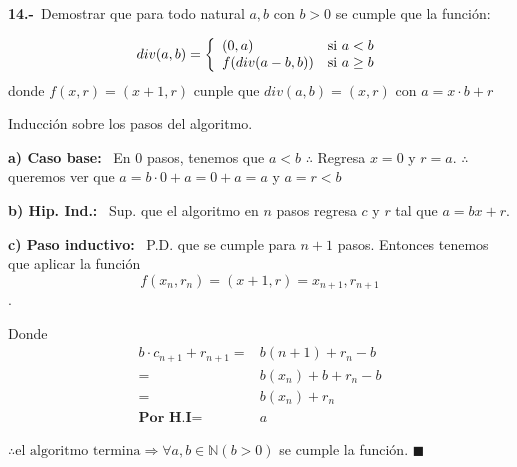 \textbf{14.-}\ Demostrar que para todo natural $a,b$ con $b > 0$ se cumple que la función:

\begingroup
\centering
\begin{equation}
    div(a,b) = \left\lbrace
    \begin{array}{ll}
     (0,a) & \textup{si } a<b\\
     f(div(a-b,b)) & \textup{si } a\geq b
    \end{array}
    \right.
\end{equation}
donde $f(x,r) = (x+1,r)$ cunple que $div(a,b)=(x,r)$ con $a=x\cdot b+r$

\endgroup

\vspace*{1em}
Inducción sobre los pasos del algoritmo.

\textbf{a) Caso base: }\ En $0$ pasos, tenemos que $a<b$ $\therefore$ Regresa $x=0$ y $r=a$. $\therefore$ queremos ver que $a=b\cdot 0 + a = 0+a=a$ y $a = r < b$

\textbf{b) Hip. Ind.: }\ Sup. que el algoritmo en $n$ pasos regresa $c$ y $r$ tal que $a=bx+r$.

\textbf{c) Paso inductivo: }\ P.D. que se cumple para $n+1$ pasos.
Entonces tenemos que aplicar la función $$f(x_n,r_n)=(x+1,r)=x_{n+1},r_{n+1}$$.


Donde 
\begin{align*}
    b\cdot c_{n+1}+r_{n+1}=&b(n+1)+r_{n}-b\\
    =&b(x_n)+b+r_n-b\\
    =&b(x_n)+r_n\\
\textbf{Por H.I}=&a
\end{align*}

$\therefore \text{el algoritmo termina}\Rightarrow \forall a,b\in \mathbb{N}(b>0)$ se cumple la función. $\blacksquare$

